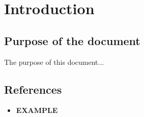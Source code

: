\documentclass[ManualeSviluppatore.tex]{subfiles}
\begin{document}
\chapter{Introduction}

	\section{Purpose of the document}
	The purpose of this document...
	
	\scopoProdottoEN
	
	\section{References}
		\begin{itemize}
			\item \textbf{EXAMPLE}\\
		\end{itemize}
\end{document}
